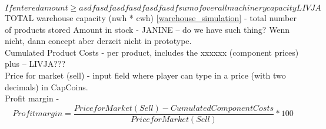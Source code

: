 \begin{equation}
   If entered amount \geqslant asdfasdfasdfasdfasdfasdf sum of overall machinery capacity LIVJA
\end{equation}
TOTAL warehouse capacity (nwh * cwh) \ref{warehouse_simulation} - total number of products stored
Amount in stock - JANINE – do we have such thing? Wenn nicht, dann concept aber derzeit nicht in prototype. \\
Cumulated Product Costs - per product, includes the xxxxxx (component prices) plus – LIVJA???\\
Price for market (sell) - input field where player can type in a price (with two decimals) in CapCoins. \\
Profit margin - \begin{equation}
    Profit margin = \frac{Price for Market (Sell) - Cumulated Component Costs}{Price for Market (Sell)} * 100
\end{equation}
